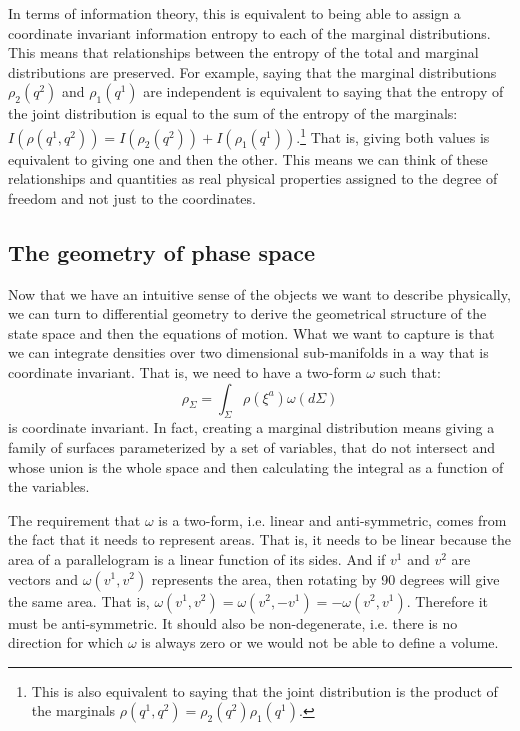 \documentclass[11pt]{article}
\begin{document}
In terms of information theory, this is equivalent to being able to assign a coordinate invariant information entropy to each of the marginal distributions. This means that relationships between the entropy of the total and marginal distributions are preserved. For example, saying that the marginal distributions $\rho_2(q^2)$ and $\rho_1(q^1)$ are independent is equivalent to saying that the entropy of the joint distribution is equal to the sum of the entropy of the marginals: $I(\rho(q^1,q^2)) = I(\rho_2(q^2)) +I(\rho_1(q^1))$.\footnote{This is also equivalent to saying that the joint distribution is the product of the marginals $\rho(q^1,q^2) = \rho_2(q^2)\rho_1(q^1)$.} That is, giving both values is equivalent to giving one and then the other. This means we can think of these relationships and quantities as real physical properties assigned to the degree of freedom and not just to the coordinates.

\subsection*{The geometry of phase space}

Now that we have an intuitive sense of the objects we want to describe physically, we can turn to differential geometry to derive the geometrical structure of the state space and then the equations of motion. What we want to capture is that we can integrate densities over two dimensional sub-manifolds in a way that is coordinate invariant. That is, we need to have a two-form $\omega$ such that:
\begin{equation}
\rho_\Sigma = \int_\Sigma \rho(\xi^a) \omega(d\Sigma)
\end{equation}
is coordinate invariant. In fact, creating a marginal distribution means giving a family of surfaces parameterized by a set of variables, that do not intersect and whose union is the whole space and then calculating the integral as a function of the variables.

The requirement that $\omega$ is a two-form, i.e. linear and anti-symmetric, comes from the fact that it needs to represent areas. That is, it needs to be linear because the area of a parallelogram is a linear function of its sides. And if $v^1$ and $v^2$ are vectors and $\omega(v^1, v^2)$ represents the area, then rotating by 90 degrees will give the same area. That is, $\omega(v^1, v^2) = \omega(v^2, -v^1) = -\omega(v^2, v^1)$. Therefore it must be anti-symmetric. It should also be non-degenerate, i.e. there is no direction for which $\omega$ is always zero or we would not be able to define a volume.
\end{document}
